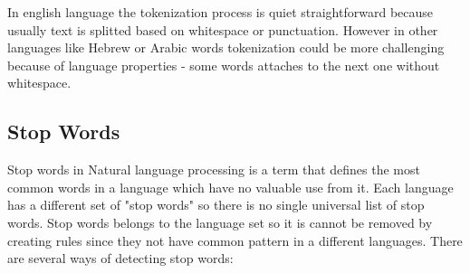 In english language the tokenization process is quiet straightforward because usually text is splitted based on whitespace or punctuation. However in other languages like Hebrew or Arabic words tokenization could be more challenging because of language properties - some words attaches to the next one without whitespace.

\subsection{Stop Words}

Stop words in Natural language processing is a term that defines the most common words in a language which have no valuable use from it. Each language has a different set of "stop words" so there is no single universal list of stop words. Stop words belongs to the language set so it is cannot be removed by creating rules since they not have common pattern in a different languages. There are several ways of detecting stop words:
